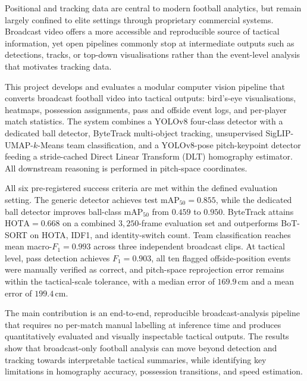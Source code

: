 
{\singlespacing
Positional and tracking data are central to modern football analytics, but
remain largely confined to elite settings through proprietary commercial
systems. Broadcast video offers a more accessible and reproducible source
of tactical information, yet open pipelines commonly stop at intermediate
outputs such as detections, tracks, or top-down visualisations rather than
the event-level analysis that motivates tracking data.

This project develops and evaluates a modular computer vision pipeline
that converts broadcast football video into tactical outputs: bird's-eye
visualisations, heatmaps, possession assignments, pass and offside event
logs, and per-player match statistics. The system combines a YOLOv8
four-class detector with a dedicated ball detector, ByteTrack multi-object
tracking, unsupervised SigLIP-UMAP-$k$-Means team classification, and a
YOLOv8-pose pitch-keypoint detector feeding a stride-cached Direct Linear Transform (DLT) homography
estimator. All downstream reasoning is performed in pitch-space
coordinates.

All six pre-registered success criteria are met within the defined evaluation setting. The generic detector
achieves test $\mathrm{mAP}_{50}=0.855$, while the dedicated ball detector
improves ball-class $\mathrm{mAP}_{50}$ from $0.459$ to $0.950$.
ByteTrack attains $\mathrm{HOTA}=0.668$ on a combined
$3{,}250$-frame evaluation set and outperforms BoT-SORT on HOTA, IDF1,
and identity-switch count. Team classification reaches mean macro-$F_1 =
0.993$ across three independent broadcast clips. At tactical level, pass
detection achieves $F_1=0.903$, all ten flagged offside-position events were manually verified as correct, 
and pitch-space reprojection error remains within the tactical-scale tolerance, 
with a median error of $169.9$\,cm and a mean error of $199.4$\,cm.

The main contribution is an end-to-end, reproducible broadcast-analysis
pipeline that requires no per-match manual labelling at inference time and produces quantitatively evaluated and visually inspectable tactical outputs. 
The results show that broadcast-only football
analysis can move beyond detection and tracking towards interpretable
tactical summaries, while identifying key limitations in homography
accuracy, possession transitions, and speed estimation.

}


